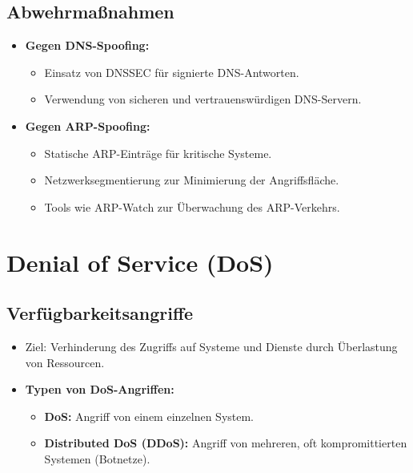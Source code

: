 \documentclass{article}
\begin{document}
\subsection{Abwehrmaßnahmen}
\begin{itemize}
    \item \textbf{Gegen DNS-Spoofing:}
    \begin{itemize}
        \item Einsatz von DNSSEC für signierte DNS-Antworten.
        \item Verwendung von sicheren und vertrauenswürdigen DNS-Servern.
    \end{itemize}
    \item \textbf{Gegen ARP-Spoofing:}
    \begin{itemize}
        \item Statische ARP-Einträge für kritische Systeme.
        \item Netzwerksegmentierung zur Minimierung der Angriffsfläche.
        \item Tools wie ARP-Watch zur Überwachung des ARP-Verkehrs.
    \end{itemize}
\end{itemize}



\section{Denial of Service (DoS)}

\subsection{Verfügbarkeitsangriffe}
\begin{itemize}
    \item Ziel: Verhinderung des Zugriffs auf Systeme und Dienste durch Überlastung von Ressourcen.
    \item \textbf{Typen von DoS-Angriffen:}
    \begin{itemize}
        \item \textbf{DoS:} Angriff von einem einzelnen System.
        \item \textbf{Distributed DoS (DDoS):} Angriff von mehreren, oft kompromittierten Systemen (Botnetze).
    \end{itemize}
\end{itemize}
\end{document}
